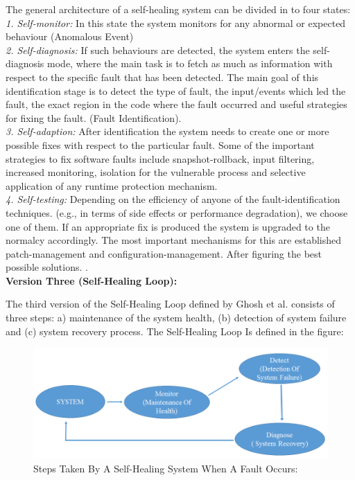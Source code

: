 The general architecture of a self-healing system can be divided in to four states: \\

\textit{1. Self-monitor:} In this state the system monitors for any abnormal or expected behaviour (Anomalous Event)\\

\textit{2. Self-diagnosis:} If such behaviours are detected, the system enters the self-diagnosis mode, where the main task is to fetch as much as information with respect to the specific fault that has been detected. The main goal of this identification stage is to detect the type of fault, the input/events which led the fault, the exact region in the code where the fault occurred and useful strategies for fixing the fault. (Fault Identification).\\

\textit{3. Self-adaption:} After identification the system needs to create one or more possible fixes with respect to the particular fault. Some of the important strategies to fix software faults include snapshot-rollback, input filtering, increased monitoring, isolation for the vulnerable process and selective application of any runtime protection mechanism.\\

\textit{4. Self-testing:} Depending on the efficiency of anyone of the fault-identification techniques. (e.g., in terms of side effects or performance degradation), we choose one of them. If an appropriate fix is produced the system is upgraded to the normalcy accordingly. The most important mechanisms for this are established patch-management and configuration-management. After figuring the best possible solutions.
\cite{Keromytis:SelfHealingSurvey:2011}.\\

\textbf{Version Three (Self-Healing Loop):\\}

The third version of the Self-Healing Loop defined by Ghosh et al. consists of three steps:   a) maintenance of the system health, (b) detection of system failure and (c) system recovery process. The Self-Healing Loop Is defined in the figure:

\begin{figure}[H]
\includegraphics[width=5in]{img/pic1}
\caption{Steps Taken By A Self-Healing System When A Fault Occurs:}
\end{figure}

